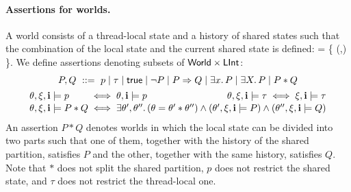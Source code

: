 
\paragraph{Assertions for worlds.}
A world consists of a thread-local state and a history of shared
states such that the combination of the local state and the 
current shared state is defined: 
\be\label{world}
\omega \in \World  =  \{ (\theta,\xi) \in 
\State \times \History \mid {(\theta * \xi_{|\xi|})\fdef}\}.
\ee
We define assertions denoting subsets of $\textsf{World} \times {\sf LInt}$:
$$
\begin{array}{@{}l@{\;}c@{\;}l@{}}
\multicolumn{3}{@{}c@{}}{
P, Q \ ::=\ p \mid \tau \mid \true \mid 
\neg P \mid P \Rightarrow Q \mid \exists x.\, P 
\mid \exists X.\, P  \mid P * Q
}
\\[1ex]
\theta, \xi, \intp \models p 
& \iff &
\theta, \intp \models p
\qquad\qquad\hfill
\theta, \xi, \intp \models \tau
\iff \xi, \intp \models \tau
\\[1pt]
\theta, \xi, \intp \models P * Q
& \iff &
\exists \theta', \theta''.\, 
(\theta = \theta' * \theta'') \wedge
(\theta',  \xi, \intp \models P) \wedge 
(\theta'',  \xi, \intp \models Q)
\end{array}
$$
An assertion $P * Q$ denotes worlds in which the local state can be divided into
two parts such that one of them, together with the history of the shared
partition, satisfies $P$ and the other, together with the same history,
satisfies $Q$. Note that $*$ does not split the shared partition, $p$ does not
restrict the shared state, and $\tau$ does not restrict the thread-local one.



